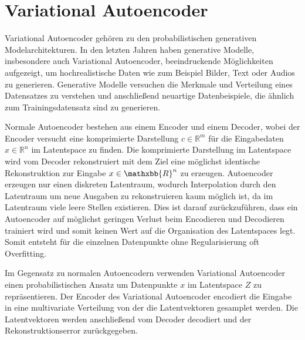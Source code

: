 \section{Variational Autoencoder}\raggedbottom
Variational Autoencoder \citep{kingma2014autoencoding} gehören zu den probabilistischen generativen Modelarchitekturen. In den letzten Jahren haben generative Modelle, insbesondere auch Variational Autoencoder, beeindruckende Möglichkeiten aufgezeigt, um hochrealistische Daten wie zum Beispiel Bilder, Text oder Audios zu generieren.
Generative Modelle versuchen die Merkmale und Verteilung eines Datensatzes zu verstehen und anschließend neuartige Datenbeispiele, die ähnlich zum Trainingsdatensatz sind zu generieren.

Normale Autoencoder bestehen aus einem Encoder und einem Decoder, wobei der Encoder versucht eine komprimierte Darstellung $c\in \mathbb{R}^m$ für die Eingabedaten $x\in \mathbb{R}^n$ im Latentspace zu finden. Die komprimierte Darstellung im Latentspace wird vom Decoder rekonstruiert mit dem Ziel eine möglichst identische Rekonstruktion zur Eingabe $x\in \mathxbb{R}^n$ zu erzeugen.
Autoencoder erzeugen nur einen diskreten Latentraum, wodurch Interpolation durch den Latentraum um neue Ausgaben zu rekonstruieren kaum möglich ist, da im Latentraum viele leere Stellen existieren. Dies ist darauf zurückzuführen, dass ein Autoencoder auf möglichst geringen Verlust beim Encodieren und Decodieren trainiert wird und somit keinen Wert auf die Organisation des Latentspaces legt. Somit entsteht für die einzelnen Datenpunkte ohne Regularisierung oft Overfitting.

Im Gegensatz zu normalen Autoencodern verwenden Variational Autoencoder einen probabilistischen Ansatz um Datenpunkte $x$ im Latentspace $Z$ zu repräsentieren. 
Der Encoder des Variational Autoencoder encodiert die Eingabe in eine multivariate Verteilung von der die Latentvektoren gesamplet werden. Die Latentvektoren werden anschließend vom Decoder decodiert und der Rekonstruktionserror zurückgegeben.


